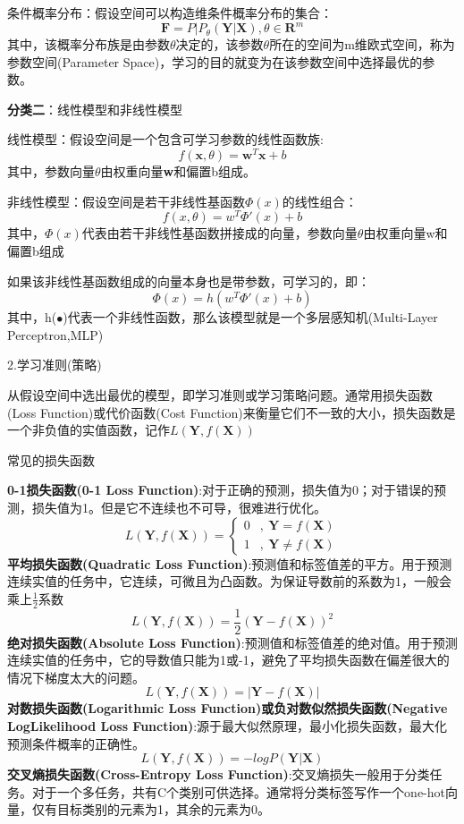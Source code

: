 \documentclass[openbib]{article}
\begin{document}
条件概率分布：假设空间可以构造维条件概率分布的集合：
$$\textbf{F}={P|P_{\theta}(\textbf{Y}|\textbf{X}),\theta \in \textbf{R}^m}$$
其中，该概率分布族是由参数$\theta$决定的，该参数$\theta$所在的空间为m维欧式空间，称为参数空间(Parameter Space)，学习的目的就变为在该参数空间中选择最优的参数。

\textbf{分类二}：线性模型和非线性模型

线性模型：假设空间是一个包含可学习参数的线性函数族:
$$f(\textbf{x},\theta)=\textbf{w}^T\textbf{x}+b$$
其中，参数向量$\theta$由权重向量\textbf{w}和偏置b组成。

非线性模型：假设空间是若干非线性基函数$\Phi(x)$的线性组合：
$$f(x,\theta)=w^T\Phi'(x)+b$$
其中，$\Phi(x)$代表由若干非线性基函数拼接成的向量，参数向量$\theta$由权重向量w和偏置b组成

如果该非线性基函数组成的向量本身也是带参数，可学习的，即：
$$\Phi(x)=h(w^T\Phi'(x)+b)$$
其中，h($\bullet$)代表一个非线性函数，那么该模型就是一个多层感知机(Multi-Layer Perceptron,MLP)

2.学习准则(策略)

从假设空间中选出最优的模型，即学习准则或学习策略问题。通常用损失函数(Loss Function)或代价函数(Cost Function)来衡量它们不一致的大小，损失函数是一个非负值的实值函数，记作$L(\textbf{Y},f(\textbf{X}))$

\begin{center}
	常见的损失函数
\end{center}
\textbf{0-1损失函数(0-1 Loss Function)}:对于正确的预测，损失值为0；对于错误的预测，损失值为1。但是它不连续也不可导，很难进行优化。
$$L(\textbf{Y},f(\textbf{X}))=\left\{ \begin{array}{cl}
	0 & , \ \textbf{Y}=f(\textbf{X}) \\
	1 & , \ \textbf{Y}\neq f(\textbf{X})
\end{array} \right.$$
\textbf{平均损失函数(Quadratic Loss Function)}:预测值和标签值差的平方。用于预测连续实值的任务中，它连续，可微且为凸函数。为保证导数前的系数为1，一般会乘上$\frac{1}{2}$系数
$$L(\textbf{Y},f(\textbf{X}))=\frac{1}{2}(\textbf{Y}-f(\textbf{X}))^2$$
\textbf{绝对损失函数(Absolute Loss Function)}:预测值和标签值差的绝对值。用于预测连续实值的任务中，它的导数值只能为1或-1，避免了平均损失函数在偏差很大的情况下梯度太大的问题。
$$L(\textbf{Y},f(\textbf{X}))=|\textbf{Y}-f(\textbf{X})|$$
\textbf{对数损失函数(Logarithmic Loss Function)或负对数似然损失函数(Negative LogLikelihood Loss Function)}:源于最大似然原理，最小化损失函数，最大化预测条件概率的正确性。
$$L(\textbf{Y},f(\textbf{X}))=-logP(\textbf{Y}|\textbf{X})$$
\textbf{交叉熵损失函数(Cross-Entropy Loss Function)}:交叉熵损失一般用于分类任务。对于一个多任务，共有C个类别可供选择。通常将分类标签写作一个one-hot向量，仅有目标类别的元素为1，其余的元素为0。
\end{document}
